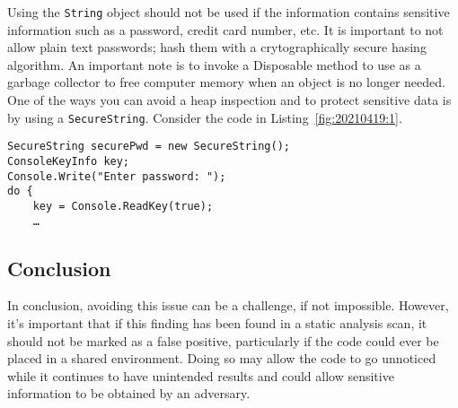 Using the \texttt{String} object should not be used if the information contains sensitive information such as a password, credit card number, etc. It is important to not allow plain text passwords; hash them with a crytographically secure hasing algorithm. An important note is to invoke a Disposable method to use as a garbage collector to free computer memory when an object is no longer needed. One of the ways you can avoid a heap inspection and to protect sensitive data is by using a \texttt{SecureString}. Consider the code in Listing~\ref{fig:20210419:1}.\autocites{20210419-codeproject}{20210419-swain}

\begin{lstlisting}[caption={SecureString Example},captionpos=b,style=CSharpStyle,basicstyle=\small,label={fig:20210419:1}]
SecureString securePwd = new SecureString();
ConsoleKeyInfo key;
Console.Write("Enter password: ");
do {
	key = Console.ReadKey(true);
	…
\end{lstlisting}

\subsection{Conclusion}

In conclusion, avoiding this issue can be a challenge, if not impossible. However, it's important that if this finding has been found in a static analysis scan, it should not be marked as a false positive, particularly if the code could ever be placed in a shared environment. Doing so may allow the code to go unnoticed while it continues to have unintended results and could allow sensitive information to be obtained by an adversary.

